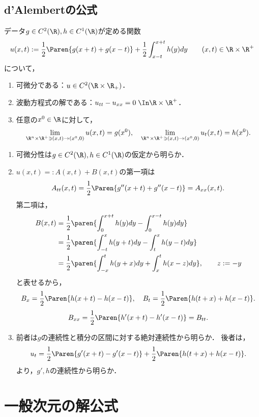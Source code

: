 \documentclass[uplatex,dvipdfmx]{jsreport}
\begin{document}
\subsection{d'Alembertの公式}

\begin{theorem}\label{thm-solution-to-WE-on-R-dAlembert}
    データ$g\in C^2(\R),h\in C^1(\R)$が定める関数
    \[u(x,t):=\frac{1}{2}\Paren{g(x+t)+g(x-t)}+\frac{1}{2}\int^{x+t}_{x-t}h(y)dy\qquad(x,t)\in\R\times\R^+\]
    について，
    \begin{enumerate}
        \item 可微分である：$u\in C^2(\R\times\R_+)$．
        \item 波動方程式の解である：$u_{tt}-u_{xx}=0\;\In\R\times\R^+$．
        \item 任意の$x^0\in\R$に対して，
        \[\lim_{\R^n\times\R^+\ni(x,t)\to (x^0,0)}u(x,t)=g(x^0),\quad\lim_{\R^n\times\R^+\ni(x,t)\to (x^0,0)}u_t(x,t)=h(x^0).\]
    \end{enumerate}
\end{theorem}
\begin{Proof}\mbox{}
    \begin{enumerate}
        \item 可微分性は$g\in C^2(\R),h\in C^1(\R)$の仮定から明らか．
        \item $u(x,t)=:A(x,t)+B(x,t)$の第一項は
        \[A_{tt}(x,t)=\frac{1}{2}\Paren{g''(x+t)+g''(x-t)}=A_{xx}(x,t).\]
        第二項は，
        \begin{align*}
            B(x,t)&=\frac{1}{2}\paren{\int^{x+t}_0h(y)dy-\int^{x-t}_{0}h(y)dy}\\
            &=\frac{1}{2}\paren{\int^{x}_{-t}h(y+t)dy-\int^{x}_th(y-t)dy}\\
            &=\frac{1}{2}\paren{\int^t_{-x}h(y+x)dy+\int^{t}_{x}h(x-z)dy},\qquad z:=-y
        \end{align*}
        と表せるから，
        \[B_x=\frac{1}{2}\Paren{h(x+t)-h(x-t)},\quad B_t=\frac{1}{2}\Paren{h(t+x)+h(x-t)}.\]
        \[B_{xx}=\frac{1}{2}\Paren{h'(x+t)-h'(x-t)}=B_{tt}.\]
        \item 前者は$g$の連続性と積分の区間に対する絶対連続性から明らか．
        後者は，
        \[u_t=\frac{1}{2}\Paren{g'(x+t)-g'(x-t)}+\frac{1}{2}\Paren{h(t+x)+h(x-t)}.\]
        より，$g',h$の連続性から明らか．
    \end{enumerate}
\end{Proof}

\section{一般次元の解公式}
\end{document}
